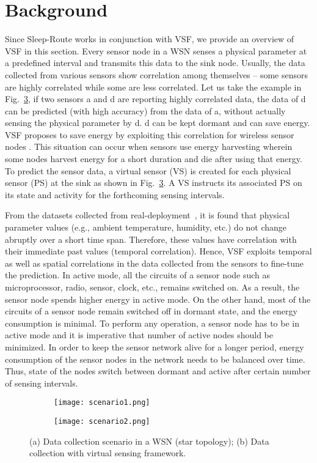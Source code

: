 \documentclass[conference]{IEEEtran}
\begin{document}
\IEEEpeerreviewmaketitle
\section{Background}
\label{background}
Since Sleep-Route works in conjunction with VSF, we provide an overview of VSF in this section. Every sensor node in a WSN senses a physical parameter at a predefined interval and transmits this data to the sink node. Usually, the data collected from various sensors show correlation among themselves -- some sensors are highly correlated while some are less correlated. Let us take the example in Fig.~\ref{fig:wsn}, if two sensors a and d are reporting highly correlated data, the data of d can be predicted (with high accuracy) from the data of a, without actually sensing the physical parameter by d. d can be kept dormant and can save energy. VSF proposes to save energy by exploiting this correlation for wireless sensor nodes \cite{sarkar2013nosense}. This situation can occur when sensors use energy harvesting wherein some nodes harvest energy for a short duration and die after using that energy\cite{prasad2014reincarnation}. To predict the sensor data, a virtual sensor (VS) is created for each physical sensor (PS) at the sink as shown in Fig.~\ref{fig:wsn}. A VS instructs its associated PS on its state and activity for the forthcoming sensing intervals. 

From the datasets collected from real-deployment~\cite{nrel,sensorscope,madden2004}, it is found that physical parameter values (e.g., ambient temperature, humidity, etc.) do not change abruptly over a short time span. Therefore, these values have correlation with their immediate past values (temporal correlation). Hence, VSF exploits temporal as well as spatial correlations in the data collected from the sensors to fine-tune the prediction. In active mode, all the circuits of a sensor node such as microprocessor, radio, sensor, clock, etc., remains switched on. As a result, the sensor node spends higher energy in active mode. On the other hand, most of the circuits of a sensor node remain switched off in dormant state, and the energy consumption is minimal. To perform any operation, a sensor node has to be in active mode and it is imperative that number of active nodes should be minimized. In order to keep the sensor network alive for a longer period, energy consumption of the sensor nodes in the network needs to be balanced over time. Thus, state of the nodes switch between dormant and active after certain number of sensing intervals. 
\begin{figure}
\centering
	\begin{subfigure}[b]{0.42\linewidth}
		\texttt{[image: scenario1.png]}
		\caption{}
		\label{fig:scenario1}
	\end{subfigure}
\hspace{2em}
	\begin{subfigure}[b]{0.42\linewidth}
		\texttt{[image: scenario2.png]}
		\caption{}
		\label{fig:scenario2}
	\end{subfigure}
\caption{(a) Data collection scenario in a WSN (star topology); (b) Data collection with virtual sensing framework.} 
\label{fig:wsn}
\end{figure}
\end{document}
